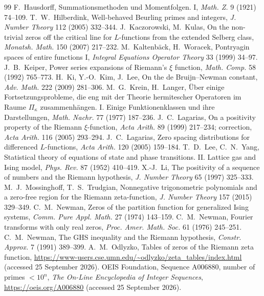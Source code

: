 \documentclass[11pt]{article}
\theoremstyle{definition}\newtheorem{definition}[theorem]{Definition}
\theoremstyle{remark}\newtheorem{remark}[theorem]{Remark}
\begin{document}
\begin{thebibliography}{99}
 F.~Hausdorff, Summationsmethoden und Momentfolgen. I, \emph{Math. Z.} 9 (1921) 74--109.
 T.~W.~Hilberdink, Well-behaved Beurling primes and integers, \emph{J. Number Theory} 112 (2005) 332--344.
 J.~Kaczorowski, M.~Kulas, On the non-trivial zeros off the critical line for $L$-functions from the extended Selberg class, \emph{Monatsh. Math.} 150 (2007) 217--232.
 M.~Kaltenb\"ack, H.~Woracek, Pontryagin spaces of entire functions I, \emph{Integral Equations Operator Theory} 33 (1999) 34--97.
 J.~B.~Keiper, Power series expansions of Riemann's $\xi$ function, \emph{Math. Comp.} 58 (1992) 765--773.
 H.~Ki, Y.-O.~Kim, J.~Lee, On the de Bruijn--Newman constant, \emph{Adv. Math.} 222 (2009) 281--306.
 M.~G.~Krein, H.~Langer, \"Uber einige Fortsetzungsprobleme, die eng mit der Theorie hermitescher Operatoren im Raume $\Pi_\kappa$ zusammenh\"angen. I. Einige Funktionenklassen und ihre Darstellungen, \emph{Math. Nachr.} 77 (1977) 187--236.
 J.~C.~Lagarias, On a positivity property of the Riemann $\xi$-function, \emph{Acta Arith.} 89 (1999) 217--234; correction, \emph{Acta Arith.} 116 (2005) 293--294.
 J.~C.~Lagarias, Zero spacing distributions for differenced $L$-functions, \emph{Acta Arith.} 120 (2005) 159--184.
 T.~D.~Lee, C.~N.~Yang, Statistical theory of equations of state and phase transitions. II. Lattice gas and Ising model, \emph{Phys. Rev.} 87 (1952) 410--419.
 X.-J.~Li, The positivity of a sequence of numbers and the Riemann hypothesis, \emph{J. Number Theory} 65 (1997) 325--333.
 M.~J.~Mossinghoff, T.~S.~Trudgian, Nonnegative trigonometric polynomials and a zero-free region for the Riemann zeta-function, \emph{J. Number Theory} 157 (2015) 329--349.
 C.~M.~Newman, Zeros of the partition function for generalized Ising systems, \emph{Comm. Pure Appl. Math.} 27 (1974) 143--159.
 C.~M.~Newman, Fourier transforms with only real zeros, \emph{Proc. Amer. Math. Soc.} 61 (1976) 245--251.
 C.~M.~Newman, The GHS inequality and the Riemann hypothesis, \emph{Constr. Approx.} 7 (1991) 389--399.
 A.~M.~Odlyzko, Tables of zeros of the Riemann zeta function, \url{https://www-users.cse.umn.edu/~odlyzko/zeta_tables/index.html} (accessed 25 September 2026).
 OEIS Foundation, Sequence A006880, number of primes $<10^n$, \emph{The On-Line Encyclopedia of Integer Sequences}, \url{https://oeis.org/A006880} (accessed 25 September 2026).

\end{thebibliography}
\end{document}

